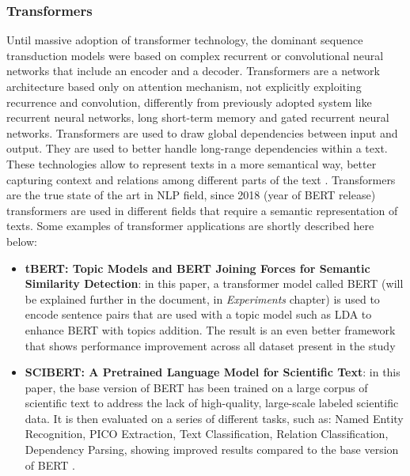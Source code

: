 \documentclass[\main/main.tex]{subfiles}
\begin{document}
\subsubsection{Transformers}
Until massive adoption of transformer technology, the dominant sequence transduction models were based on complex recurrent or convolutional neural networks that include an encoder and a decoder.
Transformers are a network architecture based only on attention mechanism, not explicitly exploiting recurrence and convolution, differently from previously adopted system like recurrent neural networks, long short-term memory and gated recurrent neural networks. Transformers are used to draw global dependencies between input and output. They are used to better handle long-range dependencies within a text. These technologies allow to represent texts in a more semantical way, better capturing context and relations among different parts of the text \cite{vaswani2017attention}. Transformers are the true state of the art in NLP field, since 2018 (year of BERT \cite{devlin2018bert}\cite{bert_blog_post} release) transformers are used in different fields that require a semantic representation of texts. Some examples of transformer applications are shortly described here below:
\begin{itemize}
    \item \textbf{tBERT: Topic Models and BERT Joining Forces for Semantic Similarity Detection}: in this paper, a transformer model called BERT (will be explained further in the document, in \emph{Experiments} chapter) is used to encode sentence pairs that are used with a topic model such as LDA to enhance BERT with topics addition. The result is an even better framework that shows performance improvement across all dataset present in the study \cite{Peinelt2020tBERTTM}
    \item \textbf{SCIBERT: A Pretrained Language Model for Scientific Text}: in this paper, the base version of BERT has been trained on a large corpus of scientific text to address the lack of high-quality, large-scale labeled scientific data. It is then evaluated on a series of different tasks, such as: Named Entity Recognition, PICO Extraction, Text Classification, Relation Classification, Dependency Parsing, showing improved results compared to the base version of BERT \cite{Beltagy2019SciBERTAP}.
\end{itemize}
\end{document}
